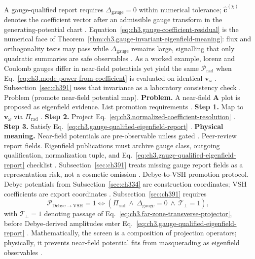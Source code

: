 A gauge-qualified report requires \(\Delta_{\mathrm{gauge}}=0\) within numerical tolerance; \(\widehat{\mathbf{c}}^{(\chi)}\) denotes the coefficient vector after an admissible gauge transform in the generating-potential chart
\cite{belinfante1940}. Equation~\eqref{eq:ch3.gauge-coefficient-residual} is the numerical face of
Theorem~\ref{thm:ch3.gauge-invariant-eigenfield-meaning}: flux and orthogonality tests may pass while \(\Delta_{\mathrm{gauge}}\) remains large,
signalling that only quadratic summaries are safe observables \cite{harrington2001}.
As a worked example, lorenz and Coulomb gauges differ in near-field potentials yet yield the same \(\mathcal{P}_{\mathrm{rad}}\) when
Eq.~\eqref{eq:ch3.mode-power-from-coefficient} is evaluated on identical \(\mathbf{v}_\omega\) \cite{stratton1941}.
Subsection~\ref{sec:ch391} uses that invariance as a laboratory consistency check \cite{belinfante1940}.
Problem (promote near-field potential map). \textbf{Problem.} A near-field \(\mathbf{A}\) plot is proposed as eigenfield evidence. List promotion requirements
\cite{belinfante1940}.
\textbf{Step 1.} Map to \(\mathbf{v}_\omega\) via \(\Pi_{\mathrm{rad}}\) \cite{harrington2001}.
\textbf{Step 2.} Project Eq.~\eqref{eq:ch3.normalized-coefficient-resolution} \cite{hansen1988}.
\textbf{Step 3.} Satisfy Eq.~\eqref{eq:ch3.gauge-qualified-eigenfield-report} \cite{belinfante1940}.
\textbf{Physical meaning.} Near-field potentials are pre-observable unless gated \cite{stratton1941}.
Peer-review report fields. Eigenfield publications must archive gauge class, outgoing qualification, normalization tuple, and
Eq.~\eqref{eq:ch3.gauge-qualified-eigenfield-report} checklist \cite{harrington2001}.
Subsection~\ref{sec:ch391} treats missing gauge report fields as a representation risk, not a cosmetic omission \cite{belinfante1940}.
Debye-to-VSH promotion protocol. Debye potentials from Subsection~\ref{sec:ch334} are construction coordinates; VSH coefficients are export coordinates \cite{tai1994}. Subsection~\ref{sec:ch391} requires
\begin{equation}
\label{eq:ch3.debye-vsh-promotion-screen}
\mathcal{P}_{\mathrm{Debye}\to\mathrm{VSH}}=1
\iff
\left(
\Pi_{\mathrm{rad}}\ \wedge\
\Delta_{\mathrm{gauge}}=0\
\wedge\
\mathcal{T}_{\perp}=1
\right),
\end{equation}
with \(\mathcal{T}_{\perp}=1\) denoting passage of Eq.~\eqref{eq:ch3.far-zone-transverse-projector}, before Debye-derived amplitudes enter Eq.~\eqref{eq:ch3.gauge-qualified-eigenfield-report} \cite{belinfante1940}. Mathematically, the screen is a composition of projection operators; physically, it prevents near-field potential fits from masquerading as eigenfield observables \cite{stratton1941}.
